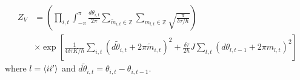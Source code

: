 \begin{equation} \label{Z_V}
    \begin{aligned}
        Z_{V} 
        &= \left(
            \prod_{i, t} 
            \int_{-\pi}^{\pi} \frac{d\theta_{i, t}}{2\pi} 
            \sum_{\tilde{m}_{i, t} \in \mathbb{Z}}
            \sum_{m_{l, t} \in \mathbb{Z}}
            \sqrt{\frac{\pi}{\delta \tau /\hbar}} 
            \right) \\
        & \times \exp \left[ 
            \frac{1}{4 \delta \tau K /\hbar} \sum_{i, t} 
                (d\tilde{\theta}_{i, t} + 2\pi \tilde{m}_{i, t})^2 
            + \frac{\delta \tau}{2\hbar} J \sum_{l, t} 
                (d\theta_{l, t-1} + 2\pi m_{l, t})^2
                \right]
    \end{aligned}
\end{equation}
where $l = \braket{ii'}$ and $ d\tilde{\theta}_{i, t} = \theta_{i, t} - \theta_{i, t-1}$.

